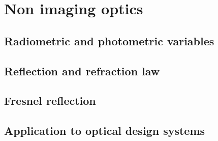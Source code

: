 \chapter{Non imaging optics}
\section{Radiometric and photometric variables}
\section{Reflection and refraction law}
\section{Fresnel reflection}
\section{Application to optical design systems}